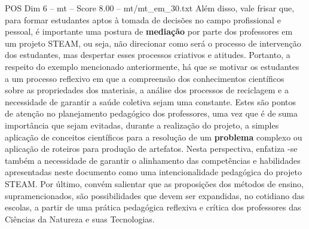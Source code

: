 \begin{textsample}{POS Dim 6 – mt – Score 8.00 – mt/mt\_em\_30.txt}
Além disso, vale frisar que, para formar estudantes aptos à tomada de decisões no campo profissional e pessoal, é importante uma postura de \textbf{mediação} por parte dos professores em um projeto STEAM, ou seja, não direcionar como será o processo de intervenção dos estudantes, mas despertar esses processos criativos e atitudes.
Portanto, a respeito do exemplo mencionado anteriormente, há que se motivar os estudantes a um processo reflexivo em que a compreensão dos conhecimentos científicos sobre as propriedades dos materiais, a análise dos processos de reciclagem e a necessidade de garantir a saúde coletiva sejam uma constante.
Estes são pontos de atenção no planejamento pedagógico dos professores, uma vez que é de suma importância que sejam evitadas, durante a realização do projeto, a simples aplicação de conceitos científicos para a resolução de um \textbf{problema} complexo ou aplicação de roteiros para produção de artefatos.
Nesta perspectiva, enfatiza -se também a necessidade de garantir o alinhamento das competências e habilidades apresentadas neste documento como uma intencionalidade pedagógica do projeto STEAM.
Por último, convém salientar que as proposições dos métodos de ensino, supramencionados, são possibilidades que devem ser expandidas, no cotidiano das escolas, a partir de uma prática pedagógica reflexiva e crítica dos professores das Ciências da Natureza e suas Tecnologias.

\end{textsample}
